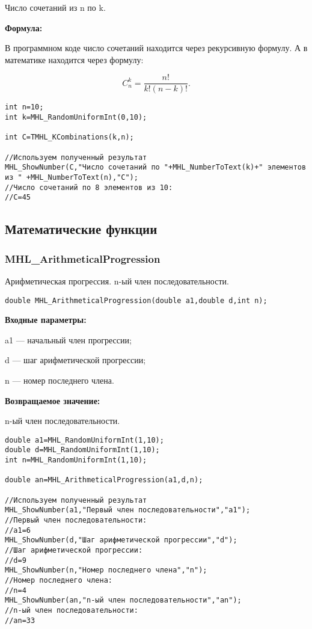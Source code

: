 \documentclass[a4paper,12pt]{article}
\begin{document}
 Число сочетаний из n по k.
 
 \textbf{Формула:}
 
 В программном коде число сочетаний находится через рекурсивную формулу. А в математике находится через формулу:
 
 \begin{equation*}
C_n^k=\dfrac{n!}{k!\left( n-k\right)! }.
\end{equation*}


\begin{lstlisting}[label=code_use_TMHL_KCombinations,caption=Пример использования]
int n=10;
int k=MHL_RandomUniformInt(0,10);

int C=TMHL_KCombinations(k,n);

//Используем полученный результат
MHL_ShowNumber(C,"Число сочетаний по "+MHL_NumberToText(k)+" элементов из " +MHL_NumberToText(n),"C");
//Число сочетаний по 8 элементов из 10:
//C=45
\end{lstlisting}

\subsection{Математические функции}

\subsubsection{MHL\_ArithmeticalProgression}\label{MHL_ArithmeticalProgression}

Арифметическая прогрессия. n-ый член последовательности.


\begin{lstlisting}[label=code_syntax_MHL_ArithmeticalProgression,caption=Синтаксис]
double MHL_ArithmeticalProgression(double a1,double d,int n);
\end{lstlisting}

\textbf{Входные параметры:}  
 
a1 --- начальный член прогрессии;
 
d --- шаг арифметической прогрессии;
 
n --- номер последнего члена.

\textbf{Возвращаемое значение:}
 
n-ый член последовательности.


\begin{lstlisting}[label=code_use_MHL_ArithmeticalProgression,caption=Пример использования]
double a1=MHL_RandomUniformInt(1,10);
double d=MHL_RandomUniformInt(1,10);
int n=MHL_RandomUniformInt(1,10);

double an=MHL_ArithmeticalProgression(a1,d,n);

//Используем полученный результат
MHL_ShowNumber(a1,"Первый член последовательности","a1");
//Первый член последовательности:
//a1=6
MHL_ShowNumber(d,"Шаг арифметической прогрессии","d");
//Шаг арифметической прогрессии:
//d=9
MHL_ShowNumber(n,"Номер последнего члена","n");
//Номер последнего члена:
//n=4
MHL_ShowNumber(an,"n-ый член последовательности","an");
//n-ый член последовательности:
//an=33
\end{lstlisting}
\end{document}
